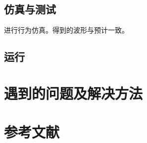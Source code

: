 \documentclass[UTF8]{article}
\begin{document}
\subsection{仿真与测试}
进行行为仿真。得到的波形与预计一致。
\subsection{运行}

\section{遇到的问题及解决方法}
\section{参考文献}
\end{document}
